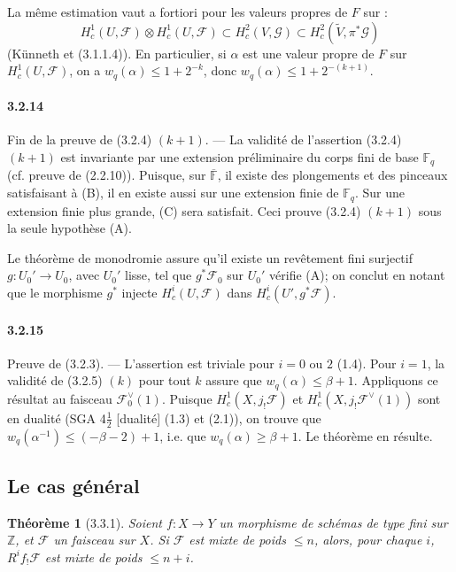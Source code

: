 \documentclass[12pt,a4paper]{article}
\theoremstyle{plain}
\newtheorem{theorem}{Th\'eor\`eme}[section]
\theoremstyle{definition}
\theoremstyle{remark}
\newcommand{\FF}{{\mathbb{F}}}
\newcommand{\ZZ}{{\mathbb{Z}}}
\begin{document}
La m\^eme estimation vaut a fortiori pour les valeurs propres de $F$ sur :
\[ H_c^1(U, \mathscr{F}) \otimes H_c^1(U, \mathscr{F}) \subset H_c^2(V, \mathscr{G}) \subset H_c^2(\widetilde{V}, \pi^*\mathscr{G}) \]
(K\"unneth et (3.1.1.4)). En particulier, si $\alpha$ est une valeur propre de $F$ sur $H_c^1(U, \mathscr{F})$, on a $w_q(\alpha) \leq 1 + 2^{-k}$, donc $w_q(\alpha) \leq 1 + 2^{-(k+1)}$.

\paragraph{3.2.14}
Fin de la preuve de (3.2.4) $(k+1)$. --- La validit\'e de l'assertion (3.2.4) $(k+1)$ est invariante par une extension pr\'eliminaire du corps fini de base $\FF_q$ (cf. preuve de (2.2.10)). Puisque, sur $\overline{\FF}$, il existe des plongements et des pinceaux satisfaisant \`a (B), il en existe aussi sur une extension finie de $\FF_q$. Sur une extension finie plus grande, (C) sera satisfait. Ceci prouve (3.2.4) $(k+1)$ sous la seule hypoth\`ese (A).

Le th\'eor\`eme de monodromie assure qu'il existe un rev\^etement fini surjectif $g : U_0' \to U_0$, avec $U_0'$ lisse, tel que $g^*\mathscr{F}_0$ sur $U_0'$ v\'erifie (A); on conclut en notant que le morphisme $g^*$ injecte $H_c^i(U, \mathscr{F})$ dans $H_c^i(U', g^*\mathscr{F})$.


\paragraph{3.2.15}
Preuve de (3.2.3). --- L'assertion est triviale pour $i = 0$ ou $2$ (1.4). Pour $i = 1$, la validit\'e de (3.2.5) $(k)$ pour tout $k$ assure que $w_q(\alpha) \leq \beta + 1$. Appliquons ce r\'esultat au faisceau $\mathscr{F}_0^\vee(1)$. Puisque $H_c^1(X, j_!\mathscr{F})$ et $H_c^1(X, j_!\mathscr{F}^\vee(1))$ sont en dualit\'e (SGA 4$\frac{1}{2}$ [dualit\'e] (1.3) et (2.1)), on trouve que $w_q(\alpha^{-1}) \leq (-\beta - 2) + 1$, i.e. que $w_q(\alpha) \geq \beta + 1$. Le th\'eor\`eme en r\'esulte.


\subsection{Le cas g\'en\'eral}

\begin{theorem}[3.3.1]
Soient $f : X \to Y$ un morphisme de sch\'emas de type fini sur $\ZZ$, et $\mathscr{F}$ un faisceau sur $X$. Si $\mathscr{F}$ est mixte de poids $\leq n$, alors, pour chaque $i$, $R^i f_! \mathscr{F}$ est mixte de poids $\leq n + i$.
\end{theorem}
\end{document}
